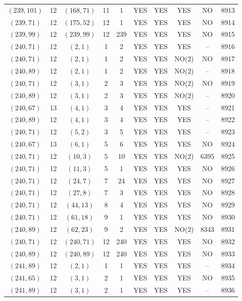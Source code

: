 \begin{longtable}{|c|c|c|c|c|c|c|c|c|c|}
$(239, 101)$ & 12 & $(168, 71)$ & 11 & 1 & YES & YES & YES & NO & 8913\\
$(239, 71)$ & 12 & $(175, 52)$ & 12 & 1 & YES & YES & YES & NO & 8914\\
$(239, 99)$ & 12 & $(239, 99)$ & 12 & 239 & YES & YES & YES & NO & 8915\\
$(240, 71)$ & 12 & $(2, 1)$ & 1 & 2 & YES & YES & YES & -- & 8916\\
$(240, 71)$ & 12 & $(2, 1)$ & 1 & 2 & YES & YES & NO(2) & NO & 8917\\
$(240, 89)$ & 12 & $(2, 1)$ & 1 & 2 & YES & YES & NO(2) & -- & 8918\\
$(240, 71)$ & 12 & $(3, 1)$ & 2 & 3 & YES & YES & NO(2) & NO & 8919\\
$(240, 89)$ & 12 & $(3, 1)$ & 2 & 3 & YES & YES & NO(2) & -- & 8920\\
$(240, 67)$ & 13 & $(4, 1)$ & 3 & 4 & YES & YES & YES & -- & 8921\\
$(240, 89)$ & 12 & $(4, 1)$ & 3 & 4 & YES & YES & YES & -- & 8922\\
$(240, 71)$ & 12 & $(5, 2)$ & 3 & 5 & YES & YES & YES & -- & 8923\\
$(240, 67)$ & 13 & $(6, 1)$ & 5 & 6 & YES & YES & YES & NO & 8924\\
$(240, 71)$ & 12 & $(10, 3)$ & 5 & 10 & YES & YES & NO(2) & 6395 & 8925\\
$(240, 71)$ & 12 & $(11, 3)$ & 5 & 1 & YES & YES & YES & NO & 8926\\
$(240, 71)$ & 12 & $(24, 7)$ & 7 & 24 & YES & YES & YES & NO & 8927\\
$(240, 71)$ & 12 & $(27, 8)$ & 7 & 3 & YES & YES & YES & NO & 8928\\
$(240, 71)$ & 12 & $(44, 13)$ & 8 & 4 & YES & YES & YES & NO & 8929\\
$(240, 71)$ & 12 & $(61, 18)$ & 9 & 1 & YES & YES & YES & NO & 8930\\
$(240, 89)$ & 12 & $(62, 23)$ & 9 & 2 & YES & YES & NO(2) & 8343 & 8931\\
$(240, 71)$ & 12 & $(240, 71)$ & 12 & 240 & YES & YES & YES & NO & 8932\\
$(240, 89)$ & 12 & $(240, 89)$ & 12 & 240 & YES & YES & YES & NO & 8933\\
$(241, 89)$ & 12 & $(2, 1)$ & 1 & 1 & YES & YES & YES & -- & 8934\\
$(241, 65)$ & 12 & $(3, 1)$ & 2 & 1 & YES & YES & YES & NO & 8935\\
$(241, 89)$ & 12 & $(3, 1)$ & 2 & 1 & YES & YES & YES & -- & 8936\\

\end{longtable}
